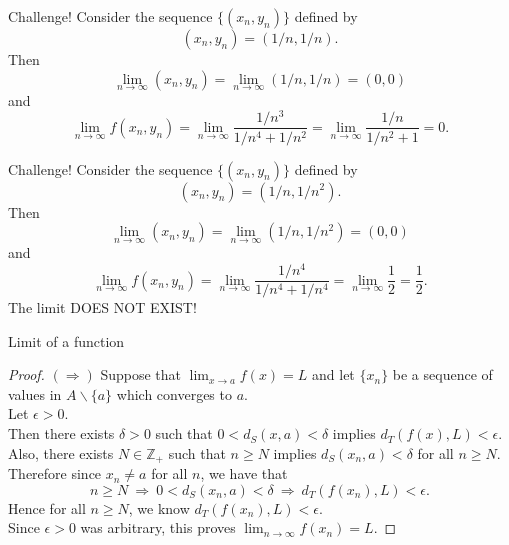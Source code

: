 \documentclass{beamer}
\begin{document}
\begin{frame}{Challenge!}
Consider the sequence $\{(x_n,y_n)\}$ defined by
$$(x_n,y_n) = (1/n,1/n).$$
\pause
Then
$$\lim_{n\rightarrow \infty} (x_n,y_n) = \lim_{n\rightarrow \infty} (1/n,1/n) = (0,0)$$
\pause
and
$$\lim_{n\rightarrow \infty} f(x_n,y_n) = \lim_{n\rightarrow \infty} \frac{1/n^3}{1/n^4+1/n^2} = \lim_{n\rightarrow \infty} \frac{1/n}{1/n^2+1} = 0.$$
\end{frame}

\begin{frame}{Challenge!}
Consider the sequence $\{(x_n,y_n)\}$ defined by
$$(x_n,y_n) = (1/n,1/n^2).$$
\pause
Then
$$\lim_{n\rightarrow \infty} (x_n,y_n) = \lim_{n\rightarrow \infty} (1/n,1/n^2) = (0,0)$$
\pause
and
$$\lim_{n\rightarrow \infty} f(x_n,y_n) = \lim_{n\rightarrow \infty} \frac{1/n^4}{1/n^4+1/n^4} = \lim_{n\rightarrow \infty} \frac{1}{2} = \frac{1}{2}.$$
\pause
{\color{red}The limit DOES NOT EXIST!}
\end{frame}


\begin{frame}{Limit of a function}
\begin{proof}
$(\Rightarrow)$\quad
Suppose that $\lim_{x\rightarrow a} f(x) =L$ and let $\{x_n\}$ be a sequence of values in $A\backslash\{a\}$ which converges to $a$.\\
\pause
Let $\epsilon > 0$.\\
\pause
Then there exists $\delta > 0$ such that $0 < d_S(x,a) < \delta$ implies $d_T(f(x),L) < \epsilon$.\\
\pause
Also, there exists $N \in\mathbb{Z}_+$ such that $n\geq N$ implies $d_S(x_n,a) < \delta$ for all $n\geq N$.\\
\pause
Therefore since $x_n\neq a$ for all $n$, we have that
$$n\geq N\ \Rightarrow\ 0 < d_S(x_n,a) < \delta\ \Rightarrow\ d_T(f(x_n), L) < \epsilon.$$
\pause
Hence for all $n\geq N$, we know $d_T(f(x_n), L) < \epsilon$.\\
\pause
Since $\epsilon > 0$ was arbitrary, this proves $\lim_{n\rightarrow \infty} f(x_n) = L$.
\end{proof}
\end{frame}
\end{document}
